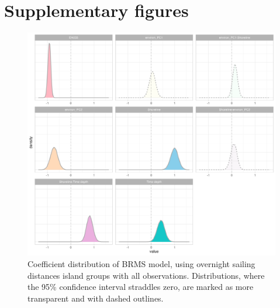 \documentclass[unnumsec,webpdf,modern,medium]{oup-authoring-template}
\begin{document}
\begin{appendices}
\begin{landscape}

\end{landscape}

\begin{landscape}

\end{landscape}




\section{Supplementary figures}
\label{appendix_supp_figs}

\begin{figure}[ht]

\includegraphics[width=\textwidth]{brms_SBZR_group_full_effect_ridge_panels_plot}
\caption{Coefficient distribution of BRMS model, using overnight sailing distances island groups with all observations. Distributions, where the 95\% confidence interval straddles zero, are marked as more transparent and with dashed outlines.}
\label{brms_SBZR_group_full_effect_ridge_panels}
\end{figure}

\begin{figure}[ht]
\centering


\end{figure}
\end{appendices}
\end{document}
